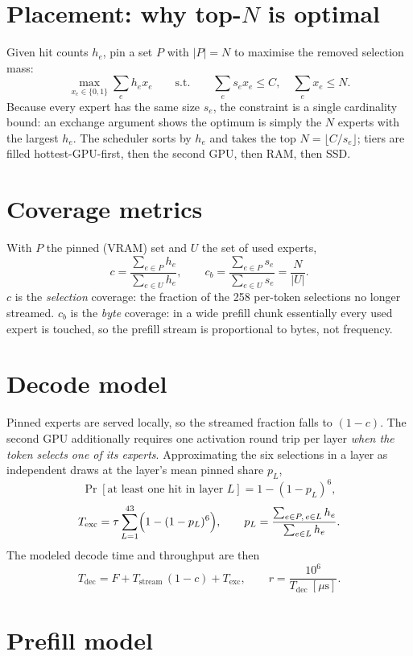 \documentclass[11pt]{article}
\begin{document}
\section{Placement: why top-$N$ is optimal}

Given hit counts $h_e$, pin a set $P$ with $|P|=N$ to maximise the removed
selection mass:
\[
\max_{x_e \in \{0,1\}} \sum_e h_e x_e
\qquad \text{s.t.} \qquad \sum_e s_e x_e \le C,\quad \sum_e x_e \le N .
\]
Because every expert has the same size $s_e$, the constraint is a single
cardinality bound: an exchange argument shows the optimum is simply the $N$
experts with the largest $h_e$. The scheduler sorts by $h_e$ and takes the
top $N = \lfloor C/s_e \rfloor$; tiers are filled hottest-GPU-first, then the
second GPU, then RAM, then SSD.

\section{Coverage metrics}

With $P$ the pinned (VRAM) set and $U$ the set of used experts,
\[
c = \frac{\sum_{e\in P} h_e}{\sum_{e\in U} h_e},
\qquad
c_b = \frac{\sum_{e\in P} s_e}{\sum_{e\in U} s_e} = \frac{N}{|U|}.
\]
$c$ is the \emph{selection} coverage: the fraction of the 258 per-token
selections no longer streamed. $c_b$ is the \emph{byte} coverage: in a wide
prefill chunk essentially every used expert is touched, so the prefill stream
is proportional to bytes, not frequency.

\section{Decode model}

Pinned experts are served locally, so the streamed fraction falls to
$(1-c)$. The second GPU additionally requires one activation round trip per
layer \emph{when the token selects one of its experts}. Approximating the six
selections in a layer as independent draws at the layer's mean pinned share
$p_L$,
\[
\Pr[\text{at least one hit in layer } L] = 1-(1-p_L)^{6},
\]
\[
T_{\text{exc}} = \tau \sum_{L=1}^{43}\Bigl(1-(1-p_L)^{6}\Bigr),
\qquad
p_L = \frac{\sum_{e\in P,\,e\in L} h_e}{\sum_{e\in L} h_e}.
\]
The modeled decode time and throughput are then
\[
T_{\text{dec}} = F + T_{\text{stream}}\,(1-c) + T_{\text{exc}},
\qquad
r = \frac{10^{6}}{T_{\text{dec}}\ [\mu\text{s}]}.
\]

\section{Prefill model}
\end{document}
